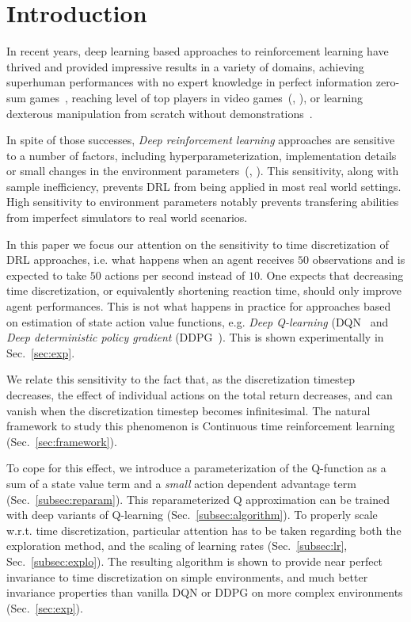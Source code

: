 
\section{Introduction}
\label{sec:intro}
In recent years, deep learning based approaches to reinforcement learning have
thrived and provided impressive results in a variety of domains, achieving superhuman
performances with no expert knowledge in perfect information zero-sum
games~\cite{alphazero}, reaching level of top players in video
games~(\citealt{openai_five}, \citealt{dqn}), or learning dexterous manipulation
from scratch without demonstrations~\cite{hand_control}.

In spite of those successes, \emph{Deep reinforcement learning} approaches are
sensitive to a number of factors, including hyperparameterization,
implementation details or small changes in the environment
parameters~(\citealt{drl_matter}, \citealt{drl_matter_bis}). This sensitivity,
along with sample inefficiency, prevents DRL from being applied in most real
world settings. High sensitivity to environment parameters notably prevents
transfering abilities from imperfect simulators to real world scenarios.

In this paper we focus our attention on the sensitivity to time discretization
of DRL approaches, i.e. what happens when an agent receives $50$ observations
and is expected to take $50$ actions per second instead of $10$. One expects
that decreasing time discretization, or equivalently shortening reaction time,
should only improve agent performances. This is not what happens in practice
for approaches based on estimation of state action value functions, e.g.
\emph{Deep Q-learning} (DQN~\citep{dqn} and \emph{Deep deterministic policy
gradient} (DDPG~\citep{ddpg}). This is shown experimentally in Sec.~\ref{sec:exp}.

We relate this sensitivity to the fact that, as the discretization timestep
decreases, the effect of individual actions on the total return decreases, and
can vanish when the discretization timestep becomes infinitesimal. The natural
framework to study this phenomenon is Continuous time reinforcement learning 
(Sec.~\ref{sec:framework}). 

To cope for this effect, we introduce a
parameterization of the Q-function as a sum of a state value term and a
\emph{small} action dependent advantage term (Sec.~\ref{subsec:reparam}). This
reparameterized Q approximation can be trained with deep variants of Q-learning
(Sec.~\ref{subsec:algorithm}).  To properly scale w.r.t. time discretization,
particular attention has to be taken regarding both the exploration method, and
the scaling of learning rates (Sec.~\ref{subsec:lr}, Sec.~\ref{subsec:explo}).
The resulting algorithm is shown to provide near perfect invariance to time
discretization on simple environments, and much better invariance properties
than vanilla DQN or DDPG on more complex environments (Sec.~\ref{sec:exp}).


